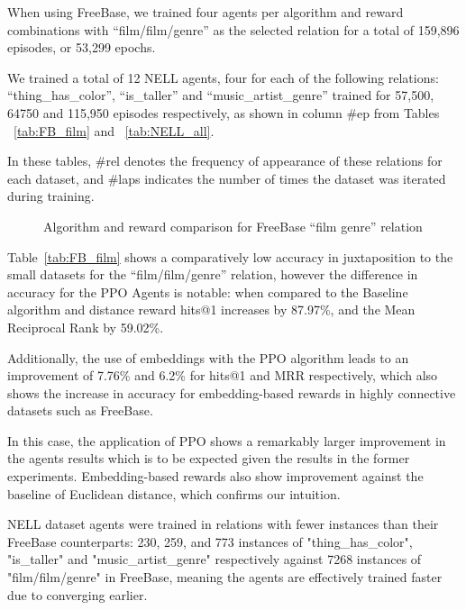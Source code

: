 When using FreeBase, we trained four agents per algorithm and reward combinations with ``film/film/genre'' as the selected relation for a total of 159,896 episodes, or 53,299 epochs.

We trained a total of 12 NELL agents, four for each of the following relations: ``thing\_has\_color'', ``is\_taller'' and ``music\_artist\_genre'' trained for 57,500, 64750 and 115,950 episodes respectively, as shown in column \#ep from Tables ~\ref{tab:FB_film} and ~\ref{tab:NELL_all}.

In these tables, \#rel denotes the frequency of appearance of these relations for each dataset, and \#laps indicates the number of times the dataset was iterated during training.



\begin{figure}[!h]
    \centering
    
    \caption{Algorithm and reward comparison for FreeBase ``film genre'' relation}
    \label{fig:fb_film_genre}
\end{figure}


Table~\ref{tab:FB_film} shows a comparatively low accuracy in juxtaposition to the small datasets for the ``film/film/genre'' relation, however the difference in accuracy for the PPO Agents is notable: when compared to the Baseline algorithm and distance reward hits@1 increases by 87.97\%, and the Mean Reciprocal Rank by 59.02\%.

Additionally, the use of embeddings with the PPO algorithm leads to an improvement of 7.76\% and 6.2\% for hits@1 and MRR respectively, which also shows the increase in accuracy for embedding-based rewards in highly connective datasets such as FreeBase.

In this case, the application of PPO shows a remarkably larger improvement in the agents results which is to be expected given the results in the former experiments. Embedding-based rewards also show improvement against the baseline of Euclidean distance, which confirms our intuition. %



NELL dataset agents were trained in relations with fewer instances than their FreeBase counterparts: 230, 259, and 773 instances of "thing\_has\_color", "is\_taller" and "music\_artist\_genre" respectively against 7268 instances of "film/film/genre" in FreeBase, meaning the agents are effectively trained faster due to converging earlier.

